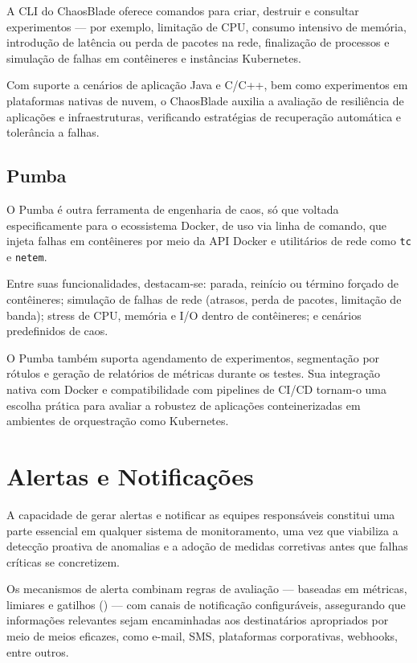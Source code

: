 A CLI do ChaosBlade oferece comandos para criar, destruir e consultar experimentos --- por exemplo, limitação de CPU, consumo intensivo de memória, introdução de latência ou perda de pacotes na rede, finalização de processos e simulação de falhas em contêineres e instâncias Kubernetes.

Com suporte a cenários de aplicação Java e C/C++, bem como experimentos em plataformas nativas de nuvem, o ChaosBlade auxilia a avaliação de resiliência de aplicações e infraestruturas, verificando estratégias de recuperação automática e tolerância a falhas.
    
\subsection{Pumba}
\label{subsection:Pumba}

O Pumba \citep{pumba2025} é outra ferramenta de engenharia de caos, só que voltada especificamente para o ecossistema Docker, de uso via linha de comando, que injeta falhas em contêineres por meio da API Docker e utilitários de rede como \verb|tc| e \verb|netem|.

Entre suas funcionalidades, destacam-se: parada, reinício ou término forçado de contêineres; simulação de falhas de rede (atrasos, perda de pacotes, limitação de banda); stress de CPU, memória e I/O dentro de contêineres; e cenários predefinidos de caos.

O Pumba também suporta agendamento de experimentos, segmentação por rótulos e geração de relatórios de métricas durante os testes. Sua integração nativa com Docker e compatibilidade com pipelines de CI/CD tornam-o uma escolha prática para avaliar a robustez de aplicações conteinerizadas em ambientes de orquestração como Kubernetes.

\section{Alertas e Notificações}
\label{section:AlertasNotificacoes}

A capacidade de gerar alertas e notificar as equipes responsáveis constitui uma parte essencial em qualquer sistema de monitoramento, uma vez que viabiliza a detecção proativa de anomalias e a adoção de medidas corretivas antes que falhas críticas se concretizem.

Os mecanismos de alerta combinam regras de avaliação --- baseadas em métricas, limiares e gatilhos () --- com canais de notificação configuráveis, assegurando que informações relevantes sejam encaminhadas aos destinatários apropriados por meio de meios eficazes, como e-mail, SMS, plataformas corporativas, webhooks, entre outros.

